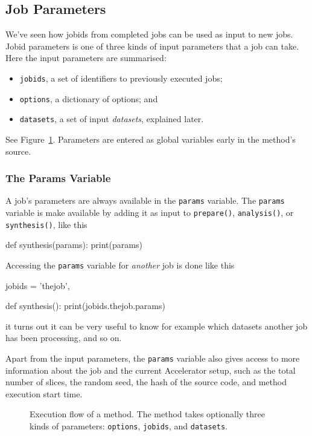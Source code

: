 \documentclass[a4paper]{article}
\begin{document}
\clearpage





\subsection{Job Parameters}


We've seen how jobids from completed jobs can be used as input to new
jobs.  Jobid parameters is one of three kinds of input parameters that
a job can take.  Here the input parameters are summarised:
\begin{itemize}
  \item[] \texttt{jobids}, a set of identifiers to previously executed jobs;
  \item[] \texttt{options}, a dictionary of options; and
  \item[] \texttt{datasets}, a set of input \textsl{datasets}, explained later.
\end{itemize}
See Figure~\ref{fig:execflow}.  Parameters are entered as global
variables early in the method's source.



\subsubsection*{The Params Variable}
A job's parameters are always available in the \texttt{params}
variable.  The \texttt{params} variable is make available by adding it
as input to \texttt{prepare()}, \texttt{analysis()}, or
\texttt{synthesis()}, like this
\begin{python}
  def synthesis(params):
    print(params)
\end{python}
Accessing the \texttt{params} variable for \textsl{another} job is
done like this
\begin{python}
  jobids = {'thejob',}

  def synthesis():
    print(jobids.thejob.params)
\end{python}
it turns out it can be very useful to know for example which datasets
another job has been processing, and so on.

Apart from the input parameters, the \texttt{params} variable also
gives access to more information about the job and the current
Accelerator setup, such as the total number of slices, the random
seed, the hash of the source code, and method execution start time.


\begin{figure}[h!]
  \begin{center}
    
    \caption{Execution flow of a method.  The method takes optionally
      three kinds of parameters: \texttt{options}, \texttt{jobids},
      and \texttt{datasets}.}
    \label{fig:execflow}
  \end{center}
\end{figure}
\end{document}
